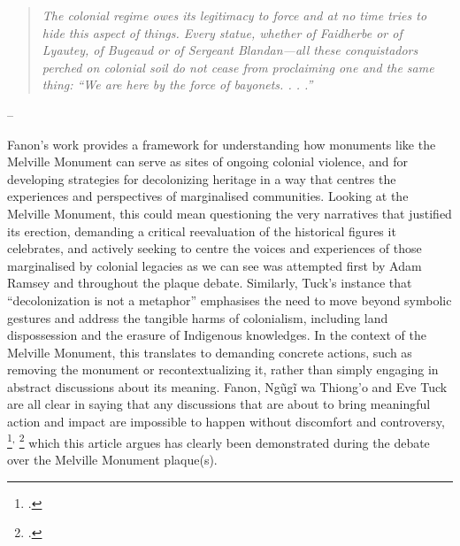 \documentclass{scrartcl}
\renewcommand{\cite}{\parencite}
\begin{document}
\begin{quotation}
\textit{The colonial regime owes its legitimacy to force and at no time tries to hide this aspect of things. Every statue, whether of Faidherbe or of Lyautey, of Bugeaud or of Sergeant Blandan—all these conquistadors perched on colonial soil do not cease from proclaiming one and the same thing: ``We are here by the force of bayonets. . . .''}
\end{quotation} 
\begin{flushright}
-- \cite[][p.85]{fanon_wretched_2002}
\end{flushright}

Fanon's work provides a framework for understanding how monuments like the Melville Monument can serve as sites of ongoing colonial violence, and for developing strategies for decolonizing heritage in a way that centres the experiences and perspectives of marginalised communities. Looking at the Melville Monument, this could mean questioning the very narratives that justified its erection, demanding a critical reevaluation of the historical figures it celebrates, and actively seeking to centre the voices and experiences of those marginalised by colonial legacies as we can see was attempted first by Adam Ramsey and throughout the plaque debate. Similarly, Tuck's instance that ``decolonization is not a metaphor'' emphasises the need to move beyond symbolic gestures and address the tangible harms of colonialism, including land dispossession and the erasure of Indigenous knowledges. In the context of the Melville Monument, this translates to demanding concrete actions, such as removing the monument or recontextualizing it, rather than simply engaging in abstract discussions about its meaning. Fanon, Ngũgĩ wa Thiong'o and Eve Tuck are all clear in saying that any discussions that are about to bring meaningful action and impact are impossible to happen without discomfort and controversy,
\footcite["Fanon positions decolonization as chaotic, an unclean break from a colonial condition that is already over determined by the violence of the colonizer and unresolved in its possible futures." 
][p.20]{eve_tuck_k_wayne_yang_decolonization_2012}\textsuperscript{,}
\footcite["Decolonization offers a different perspective to human and civil rights based approaches to justice, an unsettling one, rather than a complementary one. Decolonization is not an “and”. It is an elsewhere. "][p.36]{eve_tuck_k_wayne_yang_decolonization_2012}
which this article argues has clearly been demonstrated during the debate over the Melville Monument plaque(s). 
\end{document}
